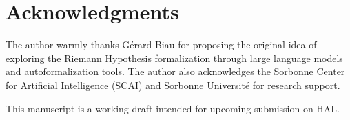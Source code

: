 \documentclass[11pt,a4paper]{article}
\theoremstyle{plain}
\theoremstyle{definition}
\theoremstyle{remark}
\begin{document}
\section*{Acknowledgments}

The author warmly thanks G\'erard Biau for proposing the original idea of exploring the Riemann Hypothesis formalization through large language models and autoformalization tools. The author also acknowledges the Sorbonne Center for Artificial Intelligence (SCAI) and Sorbonne Universit\'e for research support.

This manuscript is a working draft intended for upcoming submission on HAL.
\end{document}
